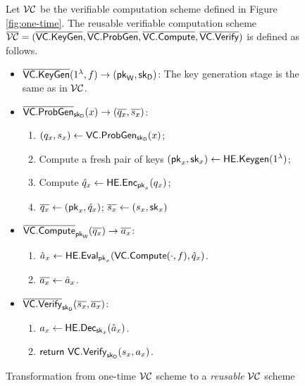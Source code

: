 \begin{figure}
\begin{framed}
Let ${\cal VC}$ be the verifiable computation scheme defined in Figure \ref{fig:one-time}. The reusable verifiable computation scheme $\overline{{\cal VC}} = (\mathsf{\overline{VC.KeyGen}},\mathsf{\overline{VC.ProbGen}},\mathsf{\overline{VC.Compute}},\mathsf{\overline{VC.Verify}})$ is defined as follows.
\begin{itemize}
\item $\mathsf{\overline{VC.KeyGen}}(1^\lambda, f) \rightarrow (\mathsf{pk}_{\mathsf{W}}, \mathsf{sk}_{\mathsf{D}})$: The key generation stage is the same as in ${\cal VC}$.
\item $\mathsf{\overline{VC.ProbGen}}_{\mathsf{sk}_{\mathsf{D}}}(x) \rightarrow (\overline{q_x}, \overline{s_x})$: 
\begin{enumerate}
\item $(q_x, s_x) \gets \mathsf{VC.ProbGen}_{\mathsf{sk}_{\mathsf{D}}}(x)$;
\item Compute a fresh pair of keys $(\mathsf{pk}_x, \mathsf{sk}_x) \gets \mathsf{HE.Keygen}(1^\lambda)$;
\item Compute $\hat{q}_x \gets \mathsf{HE.Enc}_{\mathsf{pk}_x}(q_x)$;
\item $\overline{q_x} \gets (\mathsf{pk}_x, \hat{q}_x)$; $\overline{s_x} \gets (s_x, \mathsf{sk}_x)$
\end{enumerate}
\item $\mathsf{\overline{VC.Compute}}_{\mathsf{pk}_{\mathsf{W}}}(\overline{q_x}) \rightarrow \overline{a_x}$:
\begin{enumerate}
\item $\hat{a}_x \gets \mathsf{HE.Eval}_{\mathsf{pk}_x}(\mathsf{VC.Compute}(\cdot, f), \hat{q}_x)$.
\item $\overline{a_x} \gets \hat{a}_x$.
\end{enumerate}
\item $\mathsf{\overline{VC.Verify}}_{\mathsf{sk}_{\mathsf{D}}}(\overline{s_x}, \overline{a_x})$:
\begin{enumerate}
\item $a_x \gets \mathsf{HE.Dec}_{\mathsf{sk}_x}(\hat{a}_x)$.
\item $\mathsf{return}~\mathsf{VC.Verify}_{\mathsf{sk}_{\mathsf{D}}}(s_x, a_x) $.
\end{enumerate}
\end{itemize}
\end{framed}
\caption{Transformation from one-time $\cal{VC}$ scheme to a \textit{reusable} $\cal{VC}$ scheme}
\label{fig:reusable-transform}
\end{figure}



